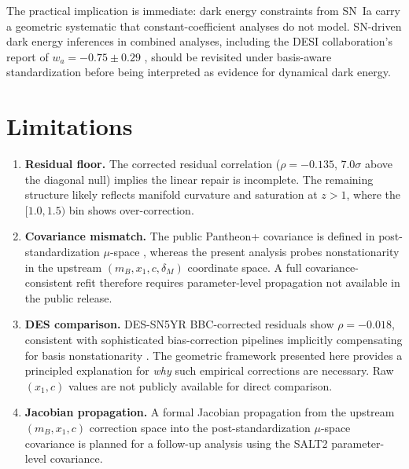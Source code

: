 \documentclass[twocolumn,showpacs,preprintnumbers,amsmath,amssymb,prl]{revtex4-2}
\begin{document}
The practical implication is immediate: dark energy constraints from SN~Ia carry a geometric systematic that constant-coefficient analyses do not model. SN-driven dark energy inferences in combined analyses, including the DESI collaboration's report of $w_a = -0.75 \pm 0.29$ \citep{DESI2024}, should be revisited under basis-aware standardization before being interpreted as evidence for dynamical dark energy.

\section{Limitations}
\label{sec:limitations}

\begin{enumerate}

\item \textbf{Residual floor.} The corrected residual correlation ($\rho = -0.135$, $7.0\sigma$ above the diagonal null) implies the linear repair is incomplete. The remaining structure likely reflects manifold curvature and saturation at $z > 1$, where the $[1.0, 1.5)$ bin shows over-correction.

\item \textbf{Covariance mismatch.} The public Pantheon+ covariance is defined in post-standardization $\mu$-space \citep{Brout2022,Keeley2023}, whereas the present analysis probes nonstationarity in the upstream $(m_B, x_1, c, \delta_M)$ coordinate space. A full covariance-consistent refit therefore requires parameter-level propagation not available in the public release.

\item \textbf{DES comparison.} DES-SN5YR BBC-corrected residuals show $\rho = -0.018$, consistent with sophisticated bias-correction pipelines implicitly compensating for basis nonstationarity \citep{DES2024}. The geometric framework presented here provides a principled explanation for \emph{why} such empirical corrections are necessary. Raw $(x_1, c)$ values are not publicly available for direct comparison.

\item \textbf{Jacobian propagation.} A formal Jacobian propagation from the upstream $(m_B, x_1, c)$ correction space into the post-standardization $\mu$-space covariance is planned for a follow-up analysis using the SALT2 parameter-level covariance.


\end{enumerate}
\end{document}
